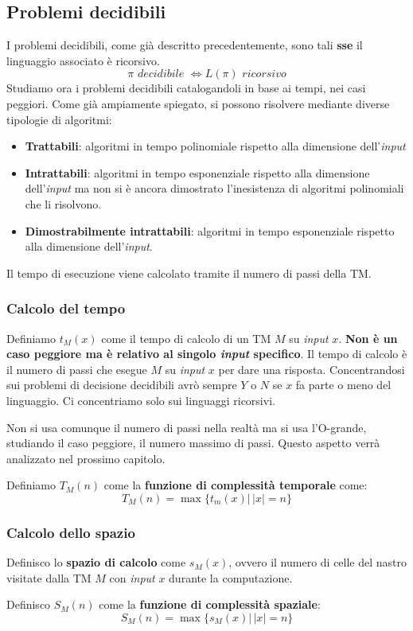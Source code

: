 \subsection{Problemi decidibili}
I problemi decidibili, come già descritto precedentemente, sono tali \textbf{sse} il linguaggio associato è ricorsivo.
\[\pi \,\,decidibile\,\, \iff L(\pi)\,\,ricorsivo\]
Studiamo ora i problemi decidibili catalogandoli in base ai tempi, nei casi
peggiori. Come già ampiamente spiegato, si possono risolvere mediante diverse tipologie di algoritmi: 
\begin{itemize}
  \item \textbf{Trattabili}: algoritmi in tempo polinomiale rispetto alla dimensione dell'\textit{input}
    \item \textbf{Intrattabili}: algoritmi in tempo esponenziale rispetto alla dimensione dell'\textit{input} ma non si è ancora dimostrato l'inesistenza di algoritmi polinomiali che li risolvono.
  \item \textbf{Dimostrabilmente intrattabili}: algoritmi in tempo esponenziale rispetto alla dimensione dell'\textit{input}.
\end{itemize}
Il tempo di esecuzione viene calcolato tramite il numero di passi della TM.
\subsubsection{Calcolo del tempo}
\begin{definizione}
  Definiamo $t_M(x)$ come il tempo di calcolo di un TM $M$ su \textit{input} $x$. \textbf{Non è
  un caso peggiore ma è relativo al singolo \textit{input} specifico}. Il tempo di
  calcolo è il numero di passi che esegue $M$ su \textit{input} $x$ per dare una
  risposta. Concentrandosi sui problemi di decisione decidibili avrò sempre $Y$
  o $N$ se $x$ fa parte o meno del linguaggio. Ci concentriamo solo sui
  linguaggi ricorsivi.
\end{definizione}
\begin{nota}

Non si usa comunque il numero di passi nella realtà ma si usa l'O-grande,
studiando il caso peggiore, il numero massimo di passi. Questo aspetto verrà analizzato nel prossimo capitolo.
\end{nota}
\begin{definizione}
  Definiamo $T_M(n)$ come la \textbf{funzione di complessità temporale} come:
  \[T_M(n)=\max\{t_m(x)|\,|x|=n\}\]
\end{definizione}
\subsubsection{Calcolo dello spazio}
\begin{definizione}
  Definisco lo \textbf{spazio di calcolo} come $s_M(x)$, ovvero il numero di celle del nastro visitate dalla TM $M$ con \textit{input} $x$ durante la computazione.
\end{definizione}
\begin{definizione}
  Definisco $S_M(n)$ come la \textbf{funzione di complessità spaziale}:
  \[S_M(n)=\max\{s_M(x)|\,|x|=n\}\]
\end{definizione}
